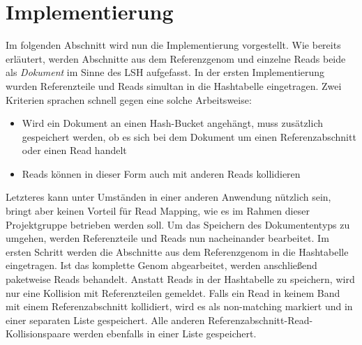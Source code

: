 \section{Implementierung}
\label{impl:cpp-lsh}
Im folgenden Abschnitt wird nun die Implementierung vorgestellt. 
Wie bereits erläutert, werden Abschnitte aus dem Referenzgenom und einzelne Reads beide als \textit{Dokument} im Sinne des LSH aufgefasst.
In der ersten Implementierung wurden Referenzteile und Reads simultan in die Hashtabelle eingetragen.
Zwei Kriterien sprachen schnell gegen eine solche Arbeitsweise:
\begin{itemize}
	\item Wird ein Dokument an einen Hash-Bucket angehängt, muss zusätzlich gespeichert werden, ob es sich bei dem Dokument um einen Referenzabschnitt oder einen Read handelt
	\item Reads können in dieser Form auch mit anderen Reads kollidieren
\end{itemize}
Letzteres kann unter Umständen in einer anderen Anwendung nützlich sein, bringt aber keinen Vorteil für Read Mapping, wie es im Rahmen dieser Projektgruppe betrieben werden soll.
Um das Speichern des Dokumententyps zu umgehen, werden Referenzteile und Reads nun nacheinander bearbeitet.
Im ersten Schritt werden die Abschnitte aus dem Referenzgenom in die Hashtabelle eingetragen.
Ist das komplette Genom abgearbeitet, werden anschließend paketweise Reads behandelt.
Anstatt Reads in der Hashtabelle zu speichern, wird nur eine Kollision mit Referenzteilen gemeldet.
Falls ein Read in keinem Band mit einem Referenzabschnitt kollidiert, wird es als non-matching markiert und in einer separaten Liste gespeichert.
Alle anderen Referenzabschnitt-Read-Kollisionspaare werden ebenfalls in einer Liste gespeichert. \\

